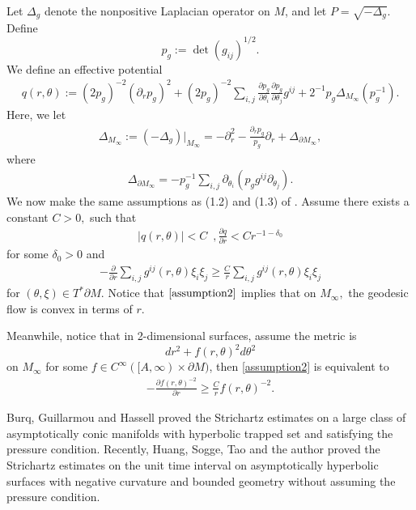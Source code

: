 \documentclass[11pt]{amsart}
\begin{document}
Let $\Delta_g$ denote the nonpositive Laplacian operator on $M$, and let
$P=\sqrt{-\Delta_g}$. Define
\[
p_g:=\det(g_{ij})^{1/2}.
\]
We define an effective potential
\begin{align*}
q(r,\theta)
:=
(2p_g)^{-2}(\partial_r p_g)^2
+(2p_g)^{-2}\sum_{i,j}
\frac{\partial p_g}{\partial\theta_i}
\frac{\partial p_g}{\partial\theta_j}g^{ij}
+2^{-1}p_g\Delta_{M_{\infty}}(p_g^{-1}).
\end{align*}
Here, we let
\begin{align}
\Delta_{M_{\infty}}
:=
(-\Delta_g)|_{M_{\infty}}
=
-\partial_r^2-\frac{\partial_rp_g}{p_g}\partial_r
+\Delta_{\partial M_\infty},
\end{align}
where
\begin{align*}
\Delta_{\partial M_\infty}
=
-p_g^{-1}\sum_{i,j}
\partial_{\theta_i}(p_g g^{ij}\partial_{\theta_j}).
\end{align*}
We now make the same assumptions as (1.2) and (1.3) of \cite{Cardoso2002UniformEO}.
Assume there exists a constant $C>0,$ such that \begin{align}\label{assumption1}
    |q(r,\theta)|<C\,\,\,,\frac{\partial q}{\partial r}<Cr^{-1-\delta_0}
\end{align}
for some $\delta_0>0$ and \begin{align}\label{assumption2}
    -\frac{\partial}{\partial r}\sum_{i,j}g^{ij}(r,\theta)\xi_i\xi_j\geq \frac{C}{r}\sum_{i,j}g^{ij}(r,\theta)\xi_i\xi_j
\end{align}
for $(\theta,\xi)\in T^*\partial M.$ Notice that $\eqref{assumption2}$ implies that on $M_\infty,$ the geodesic flow is convex in terms of $r$.

Meanwhile, notice that in 2-dimensional surfaces, assume the metric is $$dr^2+f(r,\theta)^2d\theta^2$$ on $M_\infty$ for some $f\in C^\infty([A,\infty)\times\partial M)$, then \eqref{assumption2} is equivalent to \begin{align}\label{assumption3}
    -\frac{\partial f(r,\theta)^{-2}}{\partial r}\geq \frac{C}{r}f(r,\theta)^{-2}.
\end{align}



Burq, Guillarmou and Hassell \cite{BGH} proved the Strichartz estimates on a large class of asymptotically conic manifolds with hyperbolic trapped set and satisfying the pressure condition. Recently, Huang, Sogge, Tao and the author \cite{HSTZ} proved the Strichartz estimates on the unit time interval on asymptotically hyperbolic surfaces with negative curvature and bounded geometry without assuming the pressure condition. 
\end{document}
